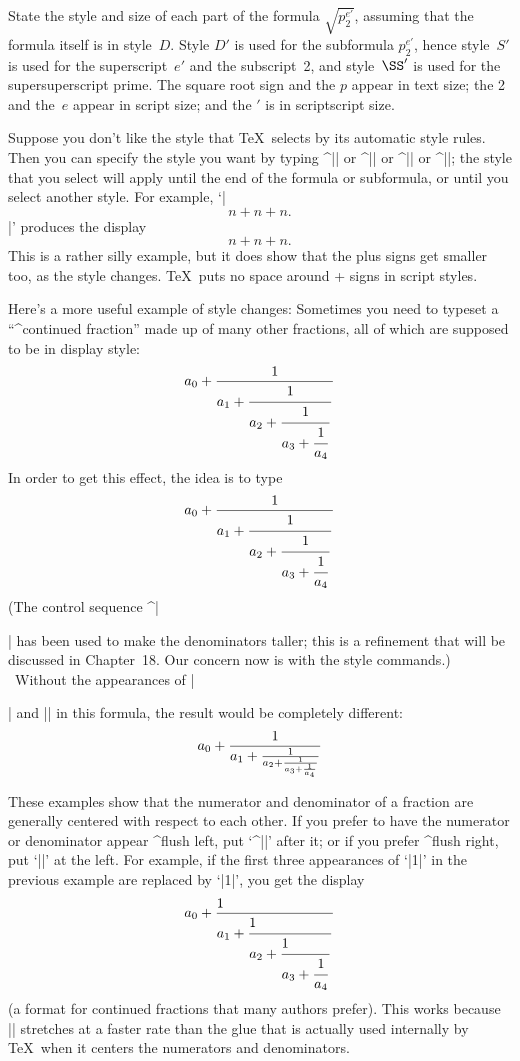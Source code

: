 \dangerexercise State the style and size of each part of the formula
$\displaystyle \sqrt{p_2^{e'}}$, assuming that the formula itself is in
style~$D$.
\answer Style $D'$ is used for the subformula $p_2^{e'}$, hence style~$S'$
is used for the superscript~$e'$ and the subscript~2, and style~$\SS'$
is used for the supersuperscript prime. The square root sign and the $p$
appear in text size; the 2 and the~$e$ appear in script size; and the
$\prime$ is in scriptscript size.

Suppose you don't like the style that \TeX\ selects by its automatic style
rules.  Then you can specify the style you want by typing ^|\displaystyle|
or ^|\textstyle| or ^|\scriptstyle| or ^|\scriptscriptstyle|; the style
that you select will apply until the end of the formula or subformula, or
until you select another style.  For example,
`|$$n+\scriptstyle n+\scriptscriptstyle n.$$|' produces the display
$$n+\scriptstyle n+\scriptscriptstyle n.$$
This is a rather silly example, but it does show
that the plus signs get smaller too, as the style changes. \TeX\ puts no
space around + signs in script styles.

Here's a more useful example of style changes: Sometimes you need to
typeset a ``^{continued fraction}'' made up of many other fractions,
all of which are supposed to be in display style:
$$a_0+{1\over\displaystyle a_1+
          {\strut 1\over\displaystyle a_2+
            {\strut 1\over\displaystyle a_3+
              {\strut 1\over a_4}}}}$$
In order to get this effect, the idea is to type
\begintt
$$a_0+{1\over\displaystyle a_1+
        {\strut 1\over\displaystyle a_2+
          {\strut 1\over\displaystyle a_3+
            {\strut 1\over a_4}}}}$$
\endtt
(The control sequence ^|\strut| has been used to make the denominators
taller; this is a refinement that will be discussed in
Chapter~18. Our concern now is with the style commands.) \
Without the appearances of\/ |\strut| and |\displaystyle| in this formula,
the result would be completely different:
$$a_0+{1\over a_1+{1\over
      a_2+{1\over a_3+{1\over a_4}}}}$$

\danger These examples show that the numerator and denominator of a fraction
are generally centered with respect to each other. If you prefer to have
the numerator or denominator appear ^{flush left}, put `^|\hfill|' after
it; or if you prefer ^{flush right}, put `|\hfill|' at the left. For
example, if the first three appearances of `|1\over|' in the previous
example are replaced by `|1\hfill\over|', you get the display
$$a_0+{1\hfill\over\displaystyle a_1+
          {\strut1\hfill\over\displaystyle a_2+
            {\strut1\hfill\over\displaystyle a_3+
              {\strut1\over a_4}}}}$$
(a format for continued fractions that many authors prefer). This works
because |\hfill| stretches at a faster rate than the glue that is
actually used internally by \TeX\ when it centers the numerators
and denominators.

